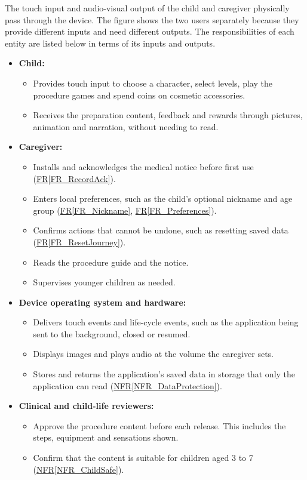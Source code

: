 \documentclass[12pt]{article}
\newcommand{\rref}[1]{\hyperref[#1]{FR\ref*{#1}}}
\newcommand{\nfrref}[1]{\hyperref[#1]{NFR\ref*{#1}}}
\begin{document}
The touch input and audio-visual output of the child and caregiver physically
pass through the device. The figure shows the two users separately because they
provide different inputs and need different outputs. The responsibilities of
each entity are listed below in terms of its inputs and outputs.

\begin{itemize}
\item \textbf{Child:}
  \begin{itemize}
  \item Provides touch input to choose a character, select levels, play the
    procedure games and spend coins on cosmetic accessories.
  \item Receives the preparation content, feedback and rewards through
    pictures, animation and narration, without needing to read.
  \end{itemize}

\item \textbf{Caregiver:}
  \begin{itemize}
  \item Installs \progname{} and acknowledges the medical notice before first
    use (\rref{FR_RecordAck}).
  \item Enters local preferences, such as the child's optional nickname and age
    group (\rref{FR_Nickname}, \rref{FR_Preferences}).
  \item Confirms actions that cannot be undone, such as resetting saved data
    (\rref{FR_ResetJourney}).
  \item Reads the procedure guide and the notice.
  \item Supervises younger children as needed.
  \end{itemize}

\item \textbf{Device operating system and hardware:}
  \begin{itemize}
  \item Delivers touch events and life-cycle events, such as the application
    being sent to the background, closed or resumed.
  \item Displays images and plays audio at the volume the caregiver sets.
  \item Stores and returns the application's saved data in storage that only
    the application can read (\nfrref{NFR_DataProtection}).
  \end{itemize}

\item \textbf{Clinical and child-life reviewers:}
  \begin{itemize}
  \item Approve the procedure content before each release. This includes the
    steps, equipment and sensations shown.
  \item Confirm that the content is suitable for children aged 3 to 7
    (\nfrref{NFR_ChildSafe}).
  \end{itemize}


\end{itemize}
\end{document}
